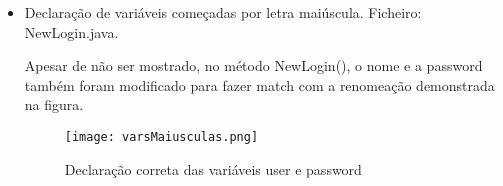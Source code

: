 
\begin{itemize}
\item Declaração de variáveis começadas por letra maiúscula. \newline
 Ficheiro: NewLogin.java.\newline

\par Apesar de não ser mostrado, no método NewLogin(), o nome e a password também foram modificado para fazer match com a renomeação demonstrada na figura.

\begin{figure}[H]

  \centering

  \texttt{[image: varsMaiusculas.png]}

  \caption {Declaração correta das variáveis user e password}

  \label {fig19}

\end{figure}

\end{itemize}





